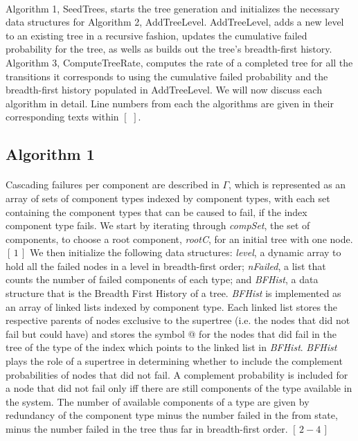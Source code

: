 \documentclass[12pt]{article}
\newcommand{\citeLine}[1]{$[\,#1\,]$}
\newcommand{\citeBlock}[2]{$[\,#1 - #2\,]$}
\begin{document}
\paragraph{} Algorithm 1, SeedTrees, starts the tree generation and initializes the necessary data structures for Algorithm 2, AddTreeLevel. AddTreeLevel, adds a new level to an existing tree in a recursive fashion, updates the cumulative failed probability for the tree, as wells as builds out the tree's breadth-first history. Algorithm 3, ComputeTreeRate, computes the rate of a completed tree for all the transitions it corresponds to using the cumulative failed probability and the breadth-first history populated in AddTreeLevel. We will now discuss each algorithm in detail. Line numbers from each the algorithms are given in their corresponding texts within \citeLine{}. 

\subsection{Algorithm 1}

\paragraph{} Cascading failures per component are described in $\Gamma$, which is represented as an array of sets of component types indexed by component types, with each set containing the component types that can be caused to fail, if the index component type fails. We start by iterating through \textit{compSet}, the set of components, to choose a root component, \textit{rootC}, for an initial tree with one node. \citeLine{1} We then initialize the following data structures: \textit{level}, a dynamic array to hold all the failed nodes in a level in breadth-first order; \textit{nFailed}, a list that counts the number of failed components of each type; and \textit{BFHist}, a data structure that is the Breadth First History of a tree. \textit{BFHist} is implemented as an array of linked lists indexed by component type. Each linked list stores the respective parents of nodes exclusive to the supertree (i.e. the nodes that did not fail but could have) and stores the symbol @ for the nodes that did fail in the tree of the type of the index which points to the linked list in \textit{BFHist}. \textit{BFHist} plays the role of a supertree in determining whether to include the complement probabilities of nodes that did not fail. A complement probability is included for a node that did not fail only iff there are still components of the type available in the system. The number of available components of a type are given by redundancy of the component type minus the number failed in the from state, minus the number failed in the tree thus far in breadth-first order. \citeBlock{2}{4}
\end{document}
